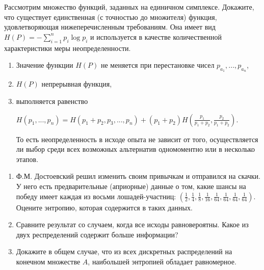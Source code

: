 \begin{problem}
Рассмотрим множество функций, заданных на единичном симплексе. Докажите, что существует единственная (с точностью до множителя) функция, удовлетворяющая нижеперечисленным требованиям. Она имеет вид $H(P) = -\sum_{i=1}^n p_i \log p_i$ и используется в качестве количественной характеристики меры неопределенности.
\begin{enumerate}
\item Значение функции $H(P)$ не меняется при перестановке чисел ${p_{a_1},..., p_{a_n}}$,
\item $H(P)$ непрерывная функция,
\item выполняется равенство
\begin{center}
$H(p_1,...,p_n) = H(p_1 + p_2, p_3,..., p_n) + (p_1 + p_2) H(\frac{p_1}{p_1+p_2},\frac{p_2}{p_1+p_2} )$.
\end{center}
То есть неопределенность в исходе опыта не зависит от того, осуществляется ли выбор среди всех возможных альтернатив одномоментно или в несколько этапов.
\end{enumerate}
\end{problem}

\begin{problem}
\begin{enumerate}
\item Ф.М. Достоевский решил изменить своим привычкам и отправился на скачки. У него есть предварительные (априорные) данные о том, какие шансы на победу имеет каждая из восьми лошадей-участниц: $(\frac{1}{2}, \frac{1}{4}, \frac{1}{8}, \frac{1}{16}, \frac{1}{64}, \frac{1}{64}, \frac{1}{64}, \frac{1}{64})$. Оцените энтропию, которая содержится в таких данных. 
\item Сравните результат со случаем, когда все исходы равновероятны. Какое из двух респределений содержит больше информации?
\item Докажите в общем случае, что из всех дискретных распределений на конечном множестве $A$, наибольшей энтропией обладает равномерное.
\end{enumerate}
\end{problem}

